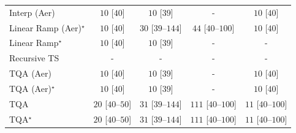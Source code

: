 \begin{tabular}{l|cccc|}
Interp (Aer) & {\cellcolor[HTML]{F7FCF5}} \color[HTML]{000000} $10$ [$40$] & {\cellcolor[HTML]{F7FCF5}} \color[HTML]{000000} $10$ [$39$] & {\cellcolor[HTML]{000000}} \color[HTML]{F1F1F1} {\cellcolor{white}} \color{black} - & {\cellcolor[HTML]{F7FCF5}} \color[HTML]{000000} $10$ [$40$] \\
Linear Ramp (Aer)$^\star$ & {\cellcolor[HTML]{F7FCF5}} \color[HTML]{000000} $10$ [$40$] & {\cellcolor[HTML]{F2FAF0}} \color[HTML]{000000} $30$ [$39$--$144$] & {\cellcolor[HTML]{F0F9EC}} \color[HTML]{000000} $44$ [$40$--$100$] & {\cellcolor[HTML]{F7FCF5}} \color[HTML]{000000} $10$ [$40$] \\
Linear Ramp$^\star$ & {\cellcolor[HTML]{F7FCF5}} \color[HTML]{000000} $10$ [$40$] & {\cellcolor[HTML]{F7FCF5}} \color[HTML]{000000} $10$ [$39$] & {\cellcolor[HTML]{000000}} \color[HTML]{F1F1F1} {\cellcolor{white}} \color{black} - & {\cellcolor[HTML]{000000}} \color[HTML]{F1F1F1} {\cellcolor{white}} \color{black} - \\
Recursive TS & {\cellcolor[HTML]{000000}} \color[HTML]{F1F1F1} {\cellcolor{white}} \color{black} - & {\cellcolor[HTML]{000000}} \color[HTML]{F1F1F1} {\cellcolor{white}} \color{black} - & {\cellcolor[HTML]{000000}} \color[HTML]{F1F1F1} {\cellcolor{white}} \color{black} - & {\cellcolor[HTML]{000000}} \color[HTML]{F1F1F1} {\cellcolor{white}} \color{black} - \\
TQA (Aer) & {\cellcolor[HTML]{F7FCF5}} \color[HTML]{000000} $10$ [$40$] & {\cellcolor[HTML]{F7FCF5}} \color[HTML]{000000} $10$ [$39$] & {\cellcolor[HTML]{000000}} \color[HTML]{F1F1F1} {\cellcolor{white}} \color{black} - & {\cellcolor[HTML]{F7FCF5}} \color[HTML]{000000} $10$ [$40$] \\
TQA (Aer)$^\star$ & {\cellcolor[HTML]{F7FCF5}} \color[HTML]{000000} $10$ [$40$] & {\cellcolor[HTML]{F7FCF5}} \color[HTML]{000000} $10$ [$39$] & {\cellcolor[HTML]{000000}} \color[HTML]{F1F1F1} {\cellcolor{white}} \color{black} - & {\cellcolor[HTML]{F7FCF5}} \color[HTML]{000000} $10$ [$40$] \\
TQA & {\cellcolor[HTML]{F5FBF2}} \color[HTML]{000000} $20$ [$40$--$50$] & {\cellcolor[HTML]{F2FAF0}} \color[HTML]{000000} $31$ [$39$--$144$] & {\cellcolor[HTML]{DEF2D9}} \color[HTML]{000000} $111$ [$40$--$100$] & {\cellcolor[HTML]{F7FCF5}} \color[HTML]{000000} $11$ [$40$--$100$] \\
TQA$^\star$ & {\cellcolor[HTML]{F5FBF2}} \color[HTML]{000000} $20$ [$40$--$50$] & {\cellcolor[HTML]{F2FAF0}} \color[HTML]{000000} $31$ [$39$--$144$] & {\cellcolor[HTML]{DEF2D9}} \color[HTML]{000000} $111$ [$40$--$100$] & {\cellcolor[HTML]{F7FCF5}} \color[HTML]{000000} $11$ [$40$--$100$] \\

\end{tabular}
